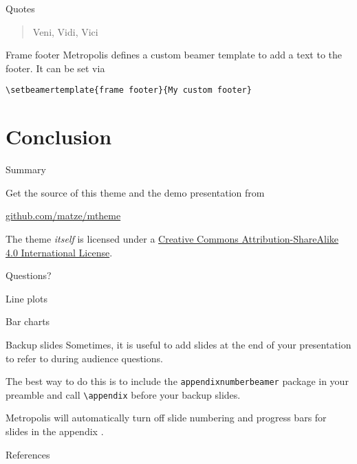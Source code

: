 \documentclass[9pt,serif,mathserif]{beamer}
\begin{document}
\begin{frame}{Quotes}
    \begin{quote}
    Veni, Vidi, Vici
    \end{quote}
\end{frame}

{%
\begin{frame}[fragile]{Frame footer}
    Metropolis defines a custom beamer template to add a text to the footer. It can be set via
    \begin{verbatim}\setbeamertemplate{frame footer}{My custom footer}\end{verbatim}
\end{frame}
}

\section{Conclusion}

\begin{frame}{Summary}

    Get the source of this theme and the demo presentation from

    \begin{center}\url{github.com/matze/mtheme}\end{center}

    The theme \emph{itself} is licensed under a
    \href{http://creativecommons.org/licenses/by-sa/4.0/}{Creative Commons
    Attribution-ShareAlike 4.0 International License}.

    \begin{center}\ccbysa\end{center}

\end{frame}

{
    \begin{frame}[standout]
        Questions?
    \end{frame}\begin{frame}{Line plots}
        
        \end{frame}
        \begin{frame}{Bar charts}
        
        \end{frame}
}

\appendix

\begin{frame}[fragile]{Backup slides}
    Sometimes, it is useful to add slides at the end of your presentation to
    refer to during audience questions.

    The best way to do this is to include the \verb|appendixnumberbeamer|
    package in your preamble and call \verb|\appendix| before your backup slides.

    Metropolis will automatically turn off slide numbering and progress bars for
    slides in the appendix \cite{Rosa2017}.
\end{frame}

\begin{frame}[allowframebreaks]{References}

    

\end{frame}
\end{document}
